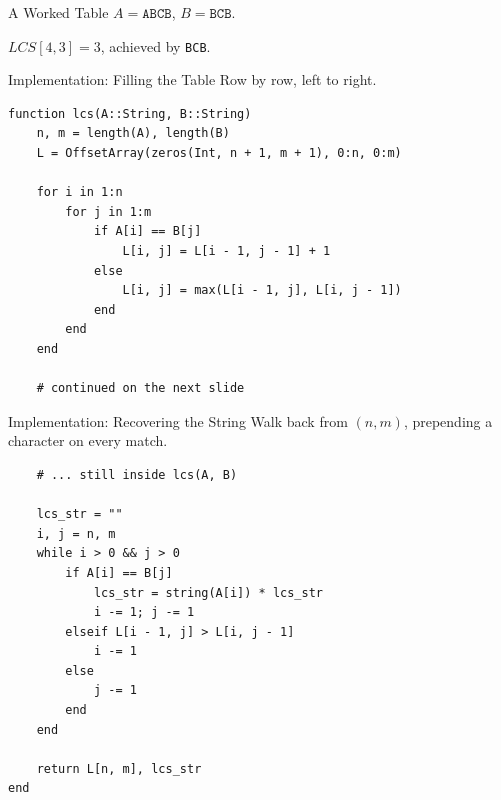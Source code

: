 \documentclass[10pt,aspectratio=169]{beamer}
\begin{document}
\begin{frame}{A Worked Table}
  $A = \texttt{ABCB}$, \quad $B = \texttt{BCB}$.

  \begin{center}
  \end{center}

  \begin{center}
    $LCS[4,3] = 3$, achieved by \texttt{BCB}.
  \end{center}
\end{frame}

\begin{frame}[fragile]{Implementation: Filling the Table}
  Row by row, left to right.

  \begin{lstlisting}
function lcs(A::String, B::String)
    n, m = length(A), length(B)
    L = OffsetArray(zeros(Int, n + 1, m + 1), 0:n, 0:m)

    for i in 1:n
        for j in 1:m
            if A[i] == B[j]
                L[i, j] = L[i - 1, j - 1] + 1
            else
                L[i, j] = max(L[i - 1, j], L[i, j - 1])
            end
        end
    end

    # continued on the next slide
  \end{lstlisting}
\end{frame}

\begin{frame}[fragile]{Implementation: Recovering the String}
  Walk back from $(n,m)$, prepending a character on every match.

  \begin{lstlisting}
    # ... still inside lcs(A, B)

    lcs_str = ""
    i, j = n, m
    while i > 0 && j > 0
        if A[i] == B[j]
            lcs_str = string(A[i]) * lcs_str
            i -= 1; j -= 1
        elseif L[i - 1, j] > L[i, j - 1]
            i -= 1
        else
            j -= 1
        end
    end

    return L[n, m], lcs_str
end
  \end{lstlisting}
\end{frame}
\end{document}
